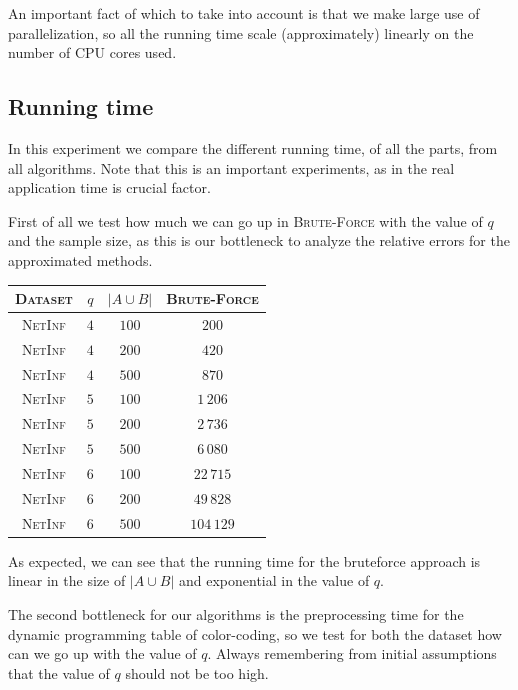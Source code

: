 An important fact of which to take into account is that we make large use of parallelization, 
so all the running time scale (approximately) linearly on the number of CPU cores used.

\subsection*{Running time}

In this experiment we compare the different running time, of all the parts, from all algorithms. Note that this is an important experiments, as in the real application time is crucial factor.\medskip

First of all we test how much we can go up in \textsc{Brute-Force} with the value of $q$ and the sample size, as this is our bottleneck to analyze the relative errors for the approximated methods.\medskip 

\begin{table}[h]
	\centering
	\begin{tabular}{|c|c|c|c|}
		\hline
		\textsc{Dataset} & $q$ & $|A \cup B|$ & \textsc{Brute-Force} \\ \hline \hline
		\textsc{NetInf}  & $4$ & $100$        & $200$                \\ \hline
		\textsc{NetInf}  & $4$ & $200$        & $420$                \\ \hline
		\textsc{NetInf}  & $4$ & $500$        & $870$                \\ \hline \hline
		\textsc{NetInf}  & $5$ & $100$        & $1\,206$             \\ \hline
		\textsc{NetInf}  & $5$ & $200$        & $2\,736$             \\ \hline
		\textsc{NetInf}  & $5$ & $500$        & $6\,080$             \\ \hline \hline
		\textsc{NetInf}  & $6$ & $100$        & $22\,715$            \\ \hline
		\textsc{NetInf}  & $6$ & $200$        & $49\,828$            \\ \hline
		\textsc{NetInf}  & $6$ & $500$        & $104\,129$           \\ \hline
	\end{tabular}
\end{table}

As expected, we can see that the running time for the bruteforce approach is linear in the size of $|A \cup B|$ and exponential in the value of $q$.\medskip

The second bottleneck for our algorithms is the preprocessing time for the dynamic programming table of color-coding, so we test for both the dataset how can we go up with the value of $q$. Always remembering from initial assumptions that the value of $q$ should not be too high. 

